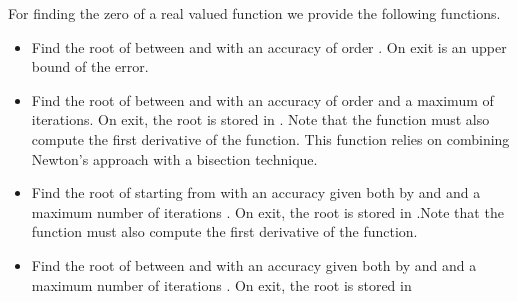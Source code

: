 For finding the zero of a real valued function we provide the following
functions.
\begin{itemize}
\item {}
  \sshortdescribe Find the root of  between  and  with
  an accuracy of order . On exit  is an upper bound of the
  error.

\item {}
  \sshortdescribe Find the root of  between  and  with
  an accuracy of order  and a maximum of  iterations. On
  exit, the root is stored in . Note that the function  must
  also compute the first derivative of the function. This function relies on
  combining Newton's approach with a bisection technique.


\item {}
  \sshortdescribe Find the root of  starting from  with an
  accuracy given both by  and  and a maximum number of
  iterations . On exit, the root is stored in .Note that
  the function  must also compute the first derivative of the function.

\item {}
  \sshortdescribe Find the root of  between  and  with
  an accuracy given both by  and  and a maximum number
  of iterations . On exit, the root is stored in 
\end{itemize}

